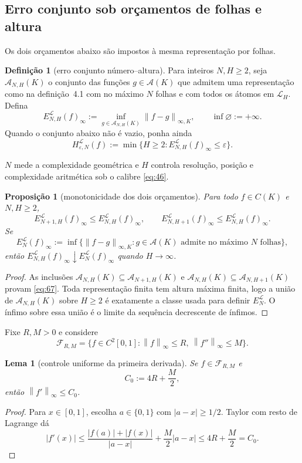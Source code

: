 \documentclass[11pt,a4paper]{article}
\theoremstyle{preciso}
\newtheorem{lema}[teorema]{Lema}
\newtheorem{proposicao}[teorema]{Proposição}
\theoremstyle{definition}
\newtheorem{definicao}[teorema]{Definição}
\newcommand{\LL}{\mathcal L}
\newcommand{\Asm}{\mathcal A}
\newcommand{\FF}{\mathcal F}
\newcommand{\norm}[1]{\left\|#1\right\|_{\infty}}
\newcommand{\normK}[2]{\left\|#1\right\|_{\infty,#2}}
\newcommand{\eqn}[2]{\begin{equation}\label{eq:#1}#2\end{equation}}
\begin{document}
\subsection{Erro conjunto sob orçamentos de folhas e altura}
Os dois orçamentos abaixo são impostos à mesma representação por folhas.
\begin{definicao}[erro conjunto número--altura]
Para inteiros $N,H\ge2$, seja $\Asm_{N,H}(K)$ o conjunto das funções $g\in\Asm(K)$ que admitem uma representação como na definição~4.1 com no máximo $N$ folhas e com todos os átomos em $\LL_H$. Defina
\eqn{65}{E^{\LL}_{N,H}(f)_\infty:=\inf_{g\in\Asm_{N,H}(K)}\normK{f-g}{K},\qquad\inf\varnothing:=+\infty.}
Quando o conjunto abaixo não é vazio, ponha ainda
\eqn{66}{H^{\LL}_{\varepsilon,N}(f):=\min\{H\ge2:E^{\LL}_{N,H}(f)_\infty\le\varepsilon\}.}
\end{definicao}
$N$ mede a complexidade geométrica e $H$ controla resolução, posição e complexidade aritmética sob o calibre \eqref{eq:46}.

\begin{proposicao}[monotonicidade dos dois orçamentos]
Para todo $f\in C(K)$ e $N,H\ge2$,
\eqn{67}{E^{\LL}_{N+1,H}(f)_\infty\le E^{\LL}_{N,H}(f)_\infty,\qquad
E^{\LL}_{N,H+1}(f)_\infty\le E^{\LL}_{N,H}(f)_\infty.}
Se
\[
E^{\LL}_N(f)_\infty:=\inf\{\normK{f-g}{K}:g\in\Asm(K)\text{ admite no máximo }N\text{ folhas}\},
\]
então $E^{\LL}_{N,H}(f)_\infty\downarrow E^{\LL}_N(f)_\infty$ quando $H\to\infty$.
\end{proposicao}
\begin{proof}
As inclusões $\Asm_{N,H}(K)\subseteq\Asm_{N+1,H}(K)$ e $\Asm_{N,H}(K)\subseteq\Asm_{N,H+1}(K)$ provam \eqref{eq:67}. Toda representação finita tem altura máxima finita, logo a união de $\Asm_{N,H}(K)$ sobre $H\ge2$ é exatamente a classe usada para definir $E^{\LL}_N$. O ínfimo sobre essa união é o limite da sequência decrescente de ínfimos.
\end{proof}
Fixe $R,M>0$ e considere
\eqn{68}{\FF_{R,M}=\{f\in C^2[0,1]:\norm f\le R,\ \norm{f''}\le M\}.}

\begin{lema}[controle uniforme da primeira derivada]
Se $f\in\FF_{R,M}$ e
\eqn{69}{C_0:=4R+\frac M2,}
então $\norm{f'}\le C_0$.
\end{lema}
\begin{proof}
Para $x\in[0,1]$, escolha $a\in\{0,1\}$ com $|a-x|\ge1/2$. Taylor com resto de Lagrange dá
\eqn{70}{|f'(x)|\le\frac{|f(a)|+|f(x)|}{|a-x|}+\frac M2|a-x|
\le4R+\frac M2=C_0.}
\end{proof}
\end{document}
